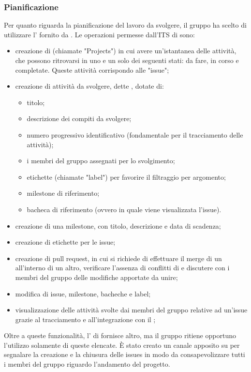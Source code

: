 \subsubsection{Pianificazione}
Per quanto riguarda la pianificazione del lavoro da svolgere, il gruppo \Gruppo{} ha scelto di utilizzare l' fornito da .
Le operazioni permesse dall'ITS di  sono:
\begin{itemize}
	\item creazione di  (chiamate "Projects") in cui avere un'istantanea delle attività, che possono ritrovarsi in uno e un solo dei seguenti stati: da fare, in corso e completate. Queste attività corrispondo alle "issue";
	\item creazione di attività da svolgere, dette , dotate di:
	\begin{itemize}
		\item titolo;
		\item descrizione dei compiti da svolgere;
		\item numero progressivo identificativo (fondamentale per il tracciamento delle attività);
		\item i membri del gruppo assegnati per lo svolgimento;
		\item etichette (chiamate "label") per favorire il filtraggio per argomento;
		\item milestone di riferimento;
		\item bacheca di riferimento (ovvero in quale  viene visualizzata l'issue).
	\end{itemize}
	\item creazione di una milestone, con titolo, descrizione e data di scadenza;
	\item creazione di etichette per le issue;
	\item creazione di pull request, in cui si richiede di effettuare il merge di un  all'interno di un altro, verificare l'assenza di conflitti di  e discutere con i membri del gruppo delle modifiche apportate da unire;
	\item modifica di issue, milestone, bacheche e label;
	\item visualizzazione delle attività svolte dai membri del gruppo relative ad un'issue grazie al tracciamento e all'integrazione con il  ;
\end{itemize}
Oltre a queste funzionalità, l' di  fornisce altro, ma il gruppo \Gruppo{} ritiene opportuno l'utilizzo solamente di queste elencate.
È stato creato un canale apposito su  per segnalare la creazione e la chiusura delle issues in modo da consapevolizzare tutti i membri del gruppo riguardo l'andamento del progetto.


